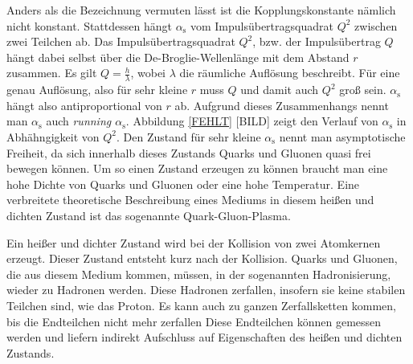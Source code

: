 Anders als die Bezeichnung vermuten l\"asst ist die Kopplungskonstante n\"amlich nicht konstant.
Stattdessen h\"angt $\alpha_\text{s}$ vom Impulsübertragsquadrat $Q^{2}$ zwischen zwei Teilchen ab.
Das Impulsübertragsquadrat $Q^{2}$, bzw. der Impulsübertrag $Q$ h\"angt dabei selbst \"uber die De-Broglie-Wellenl\"ange mit dem Abstand $r$ zusammen.
Es gilt $Q = \frac{h}{\lambda}$, wobei $\lambda$ die r\"aumliche Aufl\"osung beschreibt.
F\"ur eine genau Aufl\"osung, also f\"ur  sehr kleine $r$ muss $Q$ und damit auch $Q^{2}$ gro{\ss} sein.
$\alpha_\text{s}$ h\"angt also antiproportional von $r$ ab.
Aufgrund dieses Zusammenhangs nennt man $\alpha_\text{s}$ auch \textit{running $\alpha_\text{s}$}. Abbildung \ref{FEHLT} [BILD] zeigt den Verlauf von $\alpha_\text{s}$ in Abh\"ahngigkeit von $Q^{2}$.
Den Zustand f\"ur sehr kleine $\alpha_\text{s}$ nennt man asymptotische Freiheit, da sich innerhalb dieses Zustands Quarks und Gluonen quasi frei bewegen k\"onnen.
Um so einen Zustand erzeugen zu k\"onnen braucht man eine hohe Dichte von Quarks und Gluonen oder eine hohe Temperatur.
Eine verbreitete theoretische Beschreibung eines Mediums in diesem hei{\ss}en und dichten Zustand ist das sogenannte Quark-Gluon-Plasma.

Ein hei{\ss}er und dichter Zustand wird bei der Kollision von zwei Atomkernen erzeugt.
Dieser Zustand entsteht kurz nach der Kollision.
Quarks und Gluonen, die aus diesem Medium kommen, m\"ussen, in der sogenannten Hadronisierung, wieder zu Hadronen werden. Diese Hadronen zerfallen, insofern sie keine stabilen Teilchen sind, wie das Proton.
Es kann auch zu ganzen Zerfallsketten kommen, bis die Endteilchen nicht mehr zerfallen
Diese Endteilchen k\"onnen gemessen werden und liefern indirekt Aufschluss auf Eigenschaften des hei{\ss}en und dichten Zustands.